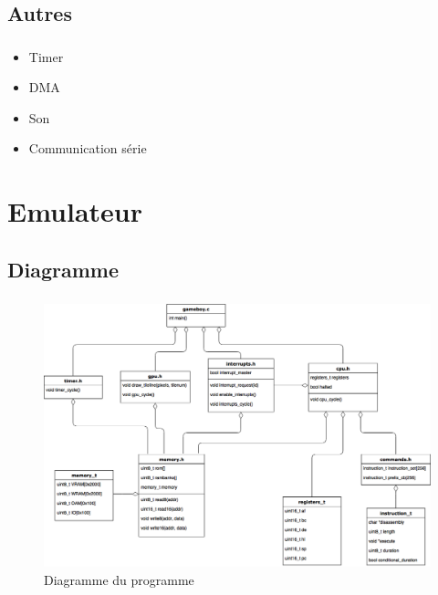 \documentclass{beamer}
\begin{document}

\subsection{Autres}
\begin{frame}
	\frametitle{\secname}
  \framesubtitle{\subsecname}
  \begin{itemize}
    \item Timer
    \item DMA
    \item Son
    \item Communication série
  \end{itemize}
\end{frame}


\section{Emulateur}
\subsection{Diagramme}
\begin{frame}
	\frametitle{\secname}
  \framesubtitle{\subsecname}
  \begin{center}
    \begin{figure}
      \includegraphics[width=.65\textwidth]{images/class_diag.png}
      \caption{Diagramme du programme}
    \end{figure}
  \end{center}
\end{frame}

\end{document}
